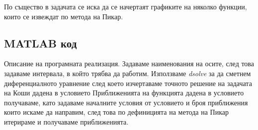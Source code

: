 \documentclass[12pt]{article}
\begin{document}
По същество в задачата се иска да се начертаят графиките на няколко функции, които се извеждат по метода на Пикар. 
\subsection{MATLAB код}
Описание на програмната реализация. Задаваме наименования на осите, след това задаваме интервала, в който трябва да работим. Използваме \textit{dsolve} за да сметнем диференциалното уравнение след което изчертаваме точното решение на задачата на Коши дадена в условието Приближенията на функцията дадена в условието получаваме, като задаваме началните условия от условието и броя приближения които искаме да направим, след това по дефиницията на метода на Пикар итерираме и получаваме приближенията.
\end{document}
